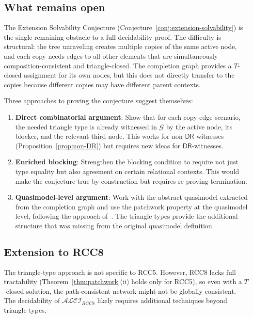 \documentclass[a4paper,11pt]{article}
\theoremstyle{definition}
\newcommand{\ALCIRCC}[1]{\ensuremath{\mathcal{ALCI}_{\mathit{RCC#1}}}}
\newcommand{\DR}{\ensuremath{\mathsf{DR}}}
\begin{document}
\subsection{What remains open}

The Extension Solvability Conjecture
(Conjecture~\ref{conj:extension-solvability}) is the single remaining
obstacle to a full decidability proof.  The difficulty is structural:
the tree unraveling creates multiple copies of the same active node,
and each copy needs edges to all other elements that are simultaneously
composition-consistent and triangle-closed.  The completion graph
provides a $T$-closed assignment for its own nodes, but this does not
directly transfer to the copies because different copies may have
different parent contexts.

Three approaches to proving the conjecture suggest themselves:
\begin{enumerate}[nosep]
  \item \textbf{Direct combinatorial argument}: Show that for each
    copy-edge scenario, the needed triangle type is already witnessed
    in $\mathcal{G}$ by the active node, its blocker, and the relevant
    third node.  This works for non-$\DR$ witnesses
    (Proposition~\ref{prop:non-DR}) but requires new ideas for
    $\DR$-witnesses.

  \item \textbf{Enriched blocking}: Strengthen the blocking condition
    to require not just type equality but also agreement on certain
    relational contexts.  This would make the conjecture true by
    construction but requires re-proving termination.

  \item \textbf{Quasimodel-level argument}: Work with the abstract
    quasimodel extracted from the completion graph and use the
    patchwork property at the quasimodel level, following the
    approach of~\cite{CompanionPaper}.  The triangle types provide
    the additional structure that was missing from the original
    quasimodel definition.
\end{enumerate}

\subsection{Extension to RCC8}

The triangle-type approach is not specific to RCC5.  However, RCC8
lacks full tractability (Theorem~\ref{thm:patchwork}(ii) holds only
for RCC5), so even with a $T$-closed solution, the path-consistent
network might not be globally consistent.  The decidability of
$\ALCIRCC{8}$ likely requires additional techniques beyond triangle
types.
\end{document}
